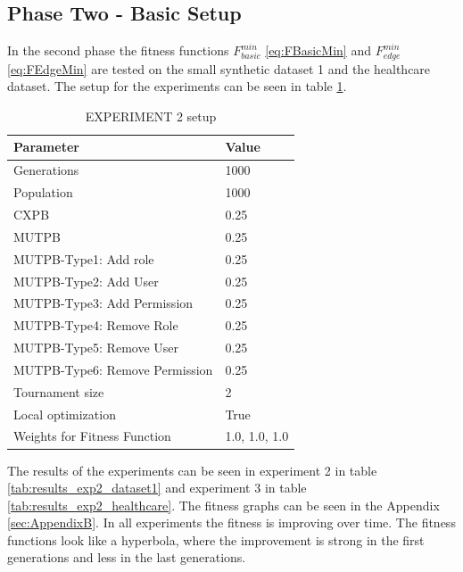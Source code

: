 \newpage
\subsection{Phase Two - Basic Setup}
\label{sec:phase2}
In the second phase the fitness functions $F_{basic}^{min}$ \eqref{eq:FBasicMin} and $F_{edge}^{min}$ \eqref{eq:FEdgeMin} are tested on the small synthetic dataset 1 and the healthcare dataset. The setup for the experiments can be seen in table \ref{tab:setup2}.
\begin{table}[H]
    \centering
    \begin{tabular}{|l|l|}
        \hline
        \rowcolor{myGray} 
        \textbf{Parameter}              & \textbf{Value}    \\ \hline
        Generations                     & 1000              \\ \hline
        Population                      & 1000              \\ \hline
        CXPB                            & 0.25              \\ \hline
        MUTPB                           & 0.25              \\ \hline
        MUTPB-Type1: Add role           & 0.25              \\ \hline
        MUTPB-Type2: Add User           & 0.25              \\ \hline
        MUTPB-Type3: Add Permission     & 0.25              \\ \hline
        MUTPB-Type4: Remove Role        & 0.25              \\ \hline
        MUTPB-Type5: Remove User        & 0.25              \\ \hline
        MUTPB-Type6: Remove Permission  & 0.25              \\ \hline
        Tournament size                 & 2                 \\ \hline
        Local optimization              & True              \\ \hline
        Weights for Fitness Function    & 1.0, 1.0, 1.0     \\ \hline
    \end{tabular}
    \caption{EXPERIMENT 2 setup}
    \label{tab:setup2}
\end{table}
The results of the experiments can be seen in experiment 2 in table \ref{tab:results_exp2_dataset1} and experiment 3 in table \ref{tab:results_exp2_healthcare}. The fitness graphs can be seen in the Appendix \ref{sec:AppendixB}. In all experiments the fitness is improving over time. The fitness functions look like a hyperbola, where the improvement is strong in the first generations and less in the last generations.\\
